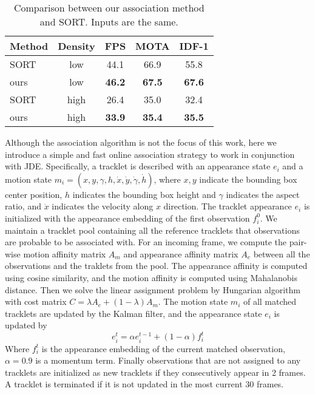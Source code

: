 \documentclass[runningheads]{llncs}
\begin{document}
\begin{wraptable}{r}{0.6\linewidth}


    
\centering
    \begin{tabular}{l | c | c  c  c }
    \toprule
    Method & Density & FPS & MOTA & IDF-1 \\
    \hline
    SORT~\cite{sort} & low & 44.1 & 66.9 & 55.8\\
    ours & low & \textbf{46.2} & \textbf{67.5} & \textbf{67.6}\\
    
    \hline
    SORT~\cite{sort} & high & 26.4 & 35.0 & 32.4\\
    ours & high & \textbf{33.9} & \textbf{35.4} & \textbf{35.5}\\
    \bottomrule
    
    \end{tabular}
    \caption{Comparison between our association method and SORT. Inputs are the same. }
    \label{tab:sort}
    
\end{wraptable}

Although the association algorithm is not the focus of this work, here we introduce a simple and fast online association strategy to work in conjunction with JDE. Specifically, a tracklet is described with an appearance state ${e}_i$ and a motion state ${m_i} = (x,y,\gamma, h, \dot{x}, \dot{y}, \dot{\gamma}, \dot{h})$, where $x,y$ indicate the bounding box center position, $h$ indicates the bounding box height and $\gamma$ indicates the aspect ratio, and $\dot{x}$ indicates the velocity along $x$ direction. The tracklet appearance $e_i$ is initialized with the appearance embedding of the first observation $f_i^0$. We maintain a tracklet pool containing all the reference tracklets that observations are probable to be associated with. For an incoming frame, we compute the pair-wise motion affinity matrix $A_m$ and appearance affinity matrix $A_e$ between all the observations and the traklets from the pool. The appearance affinity is computed using cosine similarity, and the motion affinity is computed using Mahalanobis distance. Then we solve the linear assignment problem by Hungarian algorithm with cost matrix $C=\lambda A_e + (1-\lambda) A_m$. The motion state $m_i$ of all matched tracklets are  updated by the Kalman filter, and the appearance state $e_i$ is updated by
\begin{equation}
    e_i^t = \alpha e^{t-1}_i + (1-\alpha) f_i^t
\end{equation}
Where $f_i^t$ is the appearance embedding of the current matched observation, $\alpha=0.9$ is a momentum term. Finally observations that are not assigned to any tracklets are initialized as new tracklets if they consecutively appear in 2 frames. A tracklet is terminated if it is not updated in the most current $30$ frames.
\end{document}
